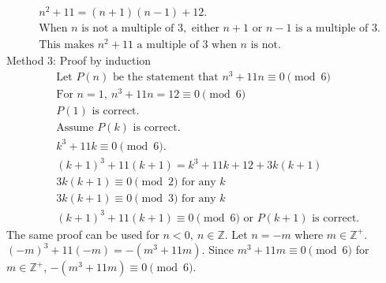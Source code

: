 \documentclass[12pt,answers]{exam}
\begin{document}
\begin{questions}
\begin{solution}
\[\begin{aligned}
        &n^2 + 11 = (n+1)(n-1)+12.\\
        &\text{When } n \text{ is not a multiple of } 3, \text{ either } n+1 \text{ or } n-1 \text{ is a multiple of }3.\\
        &\text{This makes }n^2+11 \text{ a multiple of }3 \text{ when } n \text{ is not.}         
    \end{aligned}\]
    Method 3: Proof by induction
    \[
        \begin{aligned}
            &\text{Let } P(n) \text{ be the statement that }n^3+11n \equiv 0 \pmod{6}\\
            &\text{For } n= 1,\ n^3+11n = 12 \equiv 0 \pmod{6}\\
            &P(1) \text{ is correct.}\\
            &\text{Assume } P(k) \text{ is correct}.\\
            &k^3 + 11k \equiv 0 \pmod{6}.\\
            &(k+1)^3 + 11(k+1) = k^3 + 11 k + 12 + 3 k(k+1)\\
            &3 k(k+1) \equiv 0 \pmod{2} \text{ for any } k\\
            &3 k(k+1) \equiv 0 \pmod{3} \text{ for any } k\\
            &(k+1)^3 + 11(k+1) \equiv 0 \pmod{6} \text{ or } P(k+1) \text{ is correct. }
        \end{aligned}\]
        The same proof can be used for \( n < 0,\ n \in \mathbb{Z}\). Let \(n=-m\) where \(m \in \mathbb{Z}^+\). $(-m)^3 + 11(-m) = -(m^3+11m)$. Since \(m^3+11m \equiv 0 \pmod{6}\) for \(m \in \mathbb{Z}^+\), \(-(m^3+11m) \equiv 0 \pmod{6}\).
    

\end{solution}
\end{questions}
\end{document}
